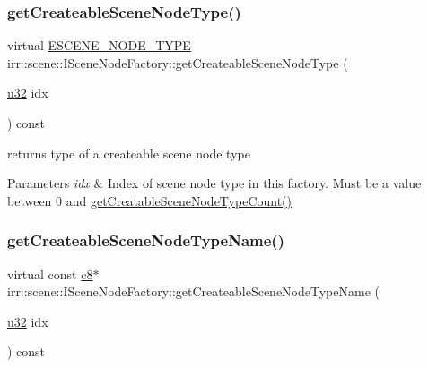 \subsubsection{\texorpdfstring{get\+Createable\+Scene\+Node\+Type()}{getCreateableSceneNodeType()}\hspace{0.1cm}{\footnotesize\ttfamily [2/2]}}
{\footnotesize\ttfamily virtual \hyperlink{namespaceirr_1_1scene_acad3d7ef92a9807d391ba29120f3b7bd}{E\+S\+C\+E\+N\+E\+\_\+\+N\+O\+D\+E\+\_\+\+T\+Y\+PE} irr\+::scene\+::\+I\+Scene\+Node\+Factory\+::get\+Createable\+Scene\+Node\+Type (\begin{DoxyParamCaption}\item[{\hyperlink{namespaceirr_a0416a53257075833e7002efd0a18e804}{u32}}]{idx }\end{DoxyParamCaption}) const\hspace{0.3cm}{\ttfamily [pure virtual]}}



returns type of a createable scene node type 


\begin{DoxyParams}{Parameters}
{\em idx} & Index of scene node type in this factory. Must be a value between 0 and \hyperlink{classirr_1_1scene_1_1ISceneNodeFactory_a3c1be487fb0169ee9fbb7169c451d16e}{get\+Creatable\+Scene\+Node\+Type\+Count()} \\
\hline
\end{DoxyParams}
\mbox{\label{classirr_1_1scene_1_1ISceneNodeFactory_a259f156cc367a9a89f79159ad2b665ac}} 
\subsubsection{\texorpdfstring{get\+Createable\+Scene\+Node\+Type\+Name()}{getCreateableSceneNodeTypeName()}\hspace{0.1cm}{\footnotesize\ttfamily [1/4]}}
{\footnotesize\ttfamily virtual const \hyperlink{namespaceirr_a9395eaea339bcb546b319e9c96bf7410}{c8}$\ast$ irr\+::scene\+::\+I\+Scene\+Node\+Factory\+::get\+Createable\+Scene\+Node\+Type\+Name (\begin{DoxyParamCaption}\item[{\hyperlink{namespaceirr_a0416a53257075833e7002efd0a18e804}{u32}}]{idx }\end{DoxyParamCaption}) const\hspace{0.3cm}{\ttfamily [pure virtual]}}




